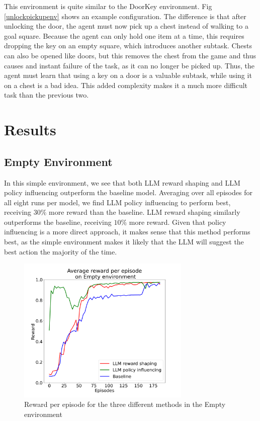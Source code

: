 \documentclass[conference]{IEEEtran}
\begin{document}
This environment is quite similar to the DoorKey environment. Fig \ref{unlockpickupenv} shows an example configuration. The difference is that after unlocking the door, the agent must now pick up a chest instead of walking to a goal square. Because the agent can only hold one item at a time, this requires dropping the key on an empty square, which introduces another subtask. Chests can also be opened like doors, but this removes the chest from the game and thus causes and instant failure of the task, as it can no longer be picked up. Thus, the agent must learn that using a key on a door is a valuable subtask, while using it on a chest is a bad idea. This added complexity makes it a much more difficult task than the previous two.

\section{Results}

\subsection{Empty Environment}

In this simple environment, we see that both LLM reward shaping and LLM policy influencing outperform the baseline model. Averaging over all episodes for all eight runs per model, we find LLM policy influencing to perform best, receiving $30\%$ more reward than the baseline. LLM reward shaping similarly outperforms the baseline, receiving $10\%$ more reward. Given that policy influencing is a more direct approach, it makes sense that this method performs best, as the simple environment makes it likely that the LLM will suggest the best action the majority of the time.

\begin{figure}[h]
\centerline{\includegraphics[width=3.25in]{figure/emptyresults.png}}
\caption{Reward per episode for the three different methods in the Empty environment}
\label{doorkeyresults}
\end{figure}
\end{document}
